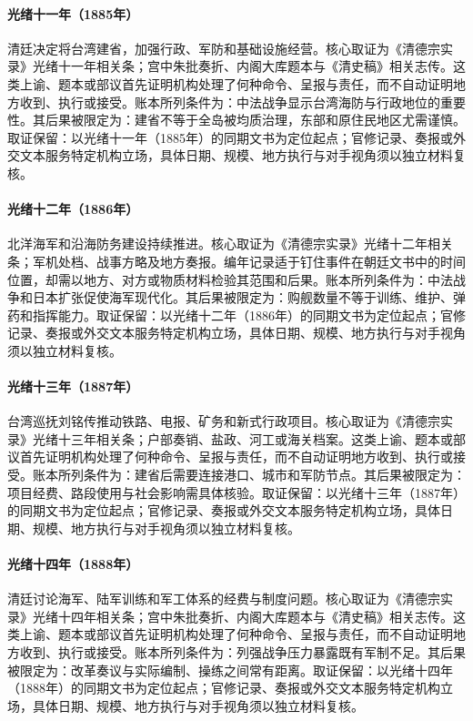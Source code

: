 \hypertarget{ledger:EQ-1885-TAIWAN-PROVINCE}{}\paragraph{光绪十一年（1885年）}清廷决定将台湾建省，加强行政、军防和基础设施经营。核心取证为《清德宗实录》光绪十一年相关条；宫中朱批奏折、内阁大库题本与《清史稿》相关志传。这类上谕、题本或部议首先证明机构处理了何种命令、呈报与责任，而不自动证明地方收到、执行或接受。账本所列条件为：中法战争显示台湾海防与行政地位的重要性。其后果被限定为：建省不等于全岛被均质治理，东部和原住民地区尤需谨慎。取证保留：以光绪十一年（1885年）的同期文书为定位起点；官修记录、奏报或外交文本服务特定机构立场，具体日期、规模、地方执行与对手视角须以独立材料复核。
\hypertarget{ledger:EQ-1886-BEIYANG-NAVY-EXPANSION}{}\paragraph{光绪十二年（1886年）}北洋海军和沿海防务建设持续推进。核心取证为《清德宗实录》光绪十二年相关条；军机处档、战事方略及地方奏报。编年记录适于钉住事件在朝廷文书中的时间位置，却需以地方、对方或物质材料检验其范围和后果。账本所列条件为：中法战争和日本扩张促使海军现代化。其后果被限定为：购舰数量不等于训练、维护、弹药和指挥能力。取证保留：以光绪十二年（1886年）的同期文书为定位起点；官修记录、奏报或外交文本服务特定机构立场，具体日期、规模、地方执行与对手视角须以独立材料复核。
\hypertarget{ledger:EQ-1887-TAIWAN-RAILWAY-PLANNING}{}\paragraph{光绪十三年（1887年）}台湾巡抚刘铭传推动铁路、电报、矿务和新式行政项目。核心取证为《清德宗实录》光绪十三年相关条；户部奏销、盐政、河工或海关档案。这类上谕、题本或部议首先证明机构处理了何种命令、呈报与责任，而不自动证明地方收到、执行或接受。账本所列条件为：建省后需要连接港口、城市和军防节点。其后果被限定为：项目经费、路段使用与社会影响需具体核验。取证保留：以光绪十三年（1887年）的同期文书为定位起点；官修记录、奏报或外交文本服务特定机构立场，具体日期、规模、地方执行与对手视角须以独立材料复核。
\hypertarget{ledger:EQ-1888-NAVAL-AND-ARMY-REFORM}{}\paragraph{光绪十四年（1888年）}清廷讨论海军、陆军训练和军工体系的经费与制度问题。核心取证为《清德宗实录》光绪十四年相关条；宫中朱批奏折、内阁大库题本与《清史稿》相关志传。这类上谕、题本或部议首先证明机构处理了何种命令、呈报与责任，而不自动证明地方收到、执行或接受。账本所列条件为：列强战争压力暴露既有军制不足。其后果被限定为：改革奏议与实际编制、操练之间常有距离。取证保留：以光绪十四年（1888年）的同期文书为定位起点；官修记录、奏报或外交文本服务特定机构立场，具体日期、规模、地方执行与对手视角须以独立材料复核。
